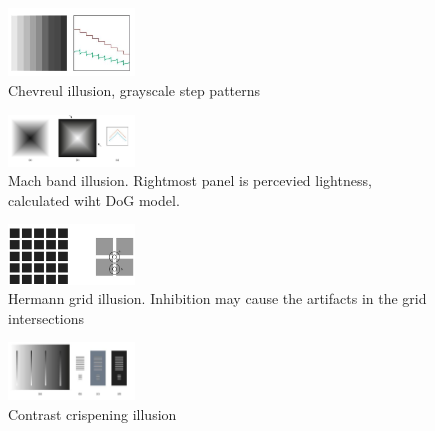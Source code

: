 \begin{mdframed}\begin{multicols}{2}
    \begin{figure}[H]
        \centering
        \includegraphics[width=0.3\textwidth]{chevreul_illusion.png}
        \caption{Chevreul illusion, grayscale step patterns}
    \end{figure}
    \begin{figure}[H]
        \centering
        \includegraphics[width=0.3\textwidth]{mach_band_illusion.png}
        \caption{Mach band illusion. Rightmost panel is percevied lightness,
        calculated wiht DoG model.}
    \end{figure}
    \begin{figure}[H]
        \centering
        \includegraphics[width=0.3\textwidth]{hermann_grid_illusion.png}
        \caption{Hermann grid illusion. Inhibition may cause the artifacts in
        the grid intersections}
    \end{figure}
    \begin{figure}[H]
        \centering
        \includegraphics[width=0.3\textwidth]{contrast_crispening.png}
        \caption{Contrast crispening illusion}
    \end{figure}
\end{multicols}\end{mdframed}




